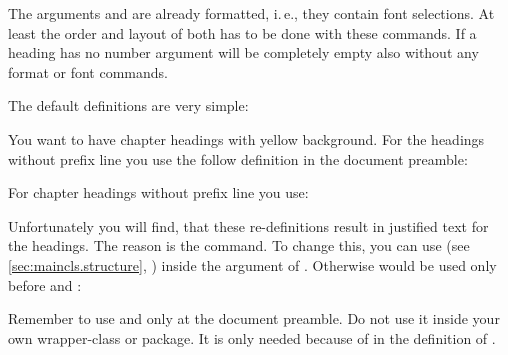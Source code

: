 The arguments  and  are already formatted, i.\,e.,
they contain font selections. At least the order and layout of both has to be
done with these commands. If a heading has no number argument 
will be completely empty also without any format or font commands.

The default definitions are very simple:
\begin{lstcode}
  \newcommand{\chapterlinesformat}[3]{%
    \@hangfrom{#2}{#3}%
  }
  \newcommand{\chapterlineswithprefixformat}[3]{%
    #2#3%
  }
\end{lstcode}

\begin{Example}
  You want to have chapter headings with yellow background. For the headings
  without prefix line you use the follow definition in the document preamble:
\begin{lstcode}
  \makeatletter
  \renewcommand{\chapterlinesformat}[3]{%
    \colorbox{yellow}{%
      \parbox{\dimexpr\linewidth-2\fboxrule-2\fboxsep}{%
        \@hangfrom{#2}#3%
      }%
    }%
  }
  \makeatother
\end{lstcode}
  For chapter headings without prefix line you use:
\begin{lstcode}
  \renewcommand{\chapterlineswithprefixformat}[3]{%
    \colorbox{yellow}{%
      \parbox{\dimexpr\linewidth-2\fboxrule-2\fboxsep}{%
        #2#3%
      }%
    }%
  }
\end{lstcode}
  Unfortunately you will find, that these re-definitions result in justified
  text for the headings. The reason is the  command. To change
  this, you can use  (see
  \autoref{sec:maincls.structure}, )
  inside the argument of . Otherwise  would
  be used only before  and
  :
\begin{lstcode}
  \makeatletter
  \renewcommand{\chapterlinesformat}[3]{%
    \colorbox{yellow}{%
      \parbox{\dimexpr\linewidth-2\fboxrule-2\fboxsep}{%
        \raggedchapter
        \@hangfrom{#2}#3%
      }%
    }%
  }
  \makeatother
  \renewcommand{\chapterlineswithprefixformat}[3]{%
    \colorbox{yellow}{%
      \parbox{\dimexpr\linewidth-2\fboxrule-2\fboxsep}{%
        \raggedchapter
        #2#3%
      }%
    }%
  }
\end{lstcode}
  Remember to use  and  only at the
  document preamble. Do not use it inside your own wrapper-class or
  package. It is only needed because of  in the definition of
  .
\end{Example}

